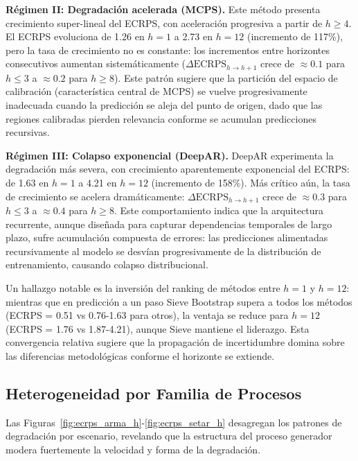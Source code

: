 \textbf{Régimen II: Degradación acelerada (MCPS).} Este método presenta crecimiento super-lineal del ECRPS, con aceleración progresiva a partir de $h \geq 4$. El ECRPS evoluciona de 1.26 en $h=1$ a 2.73 en $h=12$ (incremento de 117\%), pero la tasa de crecimiento no es constante: los incrementos entre horizontes consecutivos aumentan sistemáticamente ($\Delta \text{ECRPS}_{h \to h+1}$ crece de $\approx 0.1$ para $h \leq 3$ a $\approx 0.2$ para $h \geq 8$). Este patrón sugiere que la partición del espacio de calibración (característica central de MCPS) se vuelve progresivamente inadecuada cuando la predicción se aleja del punto de origen, dado que las regiones calibradas pierden relevancia conforme se acumulan predicciones recursivas.

\textbf{Régimen III: Colapso exponencial (DeepAR).} DeepAR experimenta la degradación más severa, con crecimiento aparentemente exponencial del ECRPS: de 1.63 en $h=1$ a 4.21 en $h=12$ (incremento de 158\%). Más crítico aún, la tasa de crecimiento se acelera dramáticamente: $\Delta \text{ECRPS}_{h \to h+1}$ crece de $\approx 0.3$ para $h \leq 3$ a $\approx 0.4$ para $h \geq 8$. Este comportamiento indica que la arquitectura recurrente, aunque diseñada para capturar dependencias temporales de largo plazo, sufre acumulación compuesta de errores: las predicciones alimentadas recursivamente al modelo se desvían progresivamente de la distribución de entrenamiento, causando colapso distribucional.

Un hallazgo notable es la inversión del ranking de métodos entre $h=1$ y $h=12$: mientras que en predicción a un paso Sieve Bootstrap supera a todos los métodos (ECRPS = 0.51 vs 0.76-1.63 para otros), la ventaja se reduce para $h=12$ (ECRPS = 1.76 vs 1.87-4.21), aunque Sieve mantiene el liderazgo. Esta convergencia relativa sugiere que la propagación de incertidumbre domina sobre las diferencias metodológicas conforme el horizonte se extiende.

\subsection{Heterogeneidad por Familia de Procesos}
\label{subsec:degradacion_por_escenario}

Las Figuras~\ref{fig:ecrps_arma_h}-\ref{fig:ecrps_setar_h} desagregan los patrones de degradación por escenario, revelando que la estructura del proceso generador modera fuertemente la velocidad y forma de la degradación.

